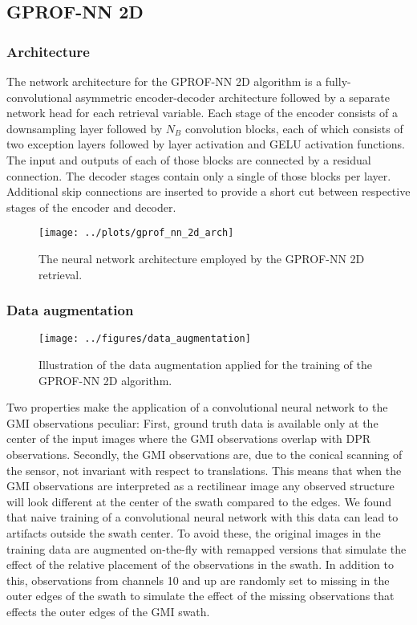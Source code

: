 \documentclass[a4paper,11pt,bibtotoc]{scrartcl}
\begin{document}
\subsection{GPROF-NN 2D}

\subsubsection{Architecture}

The network architecture for the GPROF-NN 2D algorithm is a fully-convolutional
asymmetric encoder-decoder architecture followed by a separate network head for
each retrieval variable. Each stage of the encoder consists of a downsampling
layer followed by $N_B$ convolution blocks, each of which consists of two
exception layers followed by layer activation and GELU activation functions. The
input and outputs of each of those blocks are connected by a residual
connection. The decoder stages contain only a single of those blocks per layer.
Additional skip connections are inserted to provide a short cut between
respective stages of the encoder and decoder.

\begin{figure}[hbpt]
  \centering
  \texttt{[image: ../plots/gprof\_nn\_2d\_arch]}
  \caption{
    The neural network architecture employed by the GPROF-NN 2D retrieval.
  }
  \label{fig:data_augmenation}
\end{figure}

\subsubsection{Data augmentation}


\begin{figure}[hbpt]
  \centering
    \texttt{[image: ../figures/data\_augmentation]}
    \caption{
      Illustration of the data augmentation applied for the training of the GPROF-NN 2D algorithm.
    }
  \label{fig:data_augmenation}
\end{figure}

Two properties make the application of a convolutional neural network to the GMI
observations peculiar: First, ground truth data is available only at the center
of the input images where the GMI observations overlap with DPR observations.
Secondly, the GMI observations are, due to the conical scanning of the sensor,
not invariant with respect to translations. This means that when the GMI
observations are interpreted as a rectilinear image any observed structure will
look different at the center of the swath compared to the edges. We found that
naive training of a convolutional neural network with this data can lead to
artifacts outside the swath center. To avoid these, the original images in the
training data are augmented on-the-fly with remapped versions that simulate the
effect of the relative placement of the observations in the swath. In addition
to this, observations from channels 10 and up are randomly set to missing in the
outer edges of the swath to simulate the effect of the missing observations that
effects the outer edges of the GMI swath.
\end{document}
